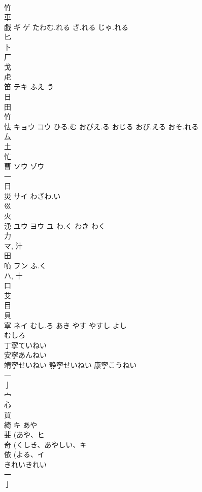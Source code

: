 \documentclass[8pt]{extreport}
\begin{document}
\begin{CJK}{UTF8}{min}
\\	竹 
\\	車 
\\	戯	ギ ゲ	たわむ.れる ざ.れる じゃ.れる	
\\	匕 
\\	卜 
\\	厂 
\\	戈 
\\	虍 
\\	笛	テキ	ふえ う	
\\	日 
\\	田 
\\	竹 
\\	怯	キョウ コウ	ひる.む おびえ.る おじる おび.える おそ.れる	
\\	厶 
\\	土 
\\	忙 
\\	曹	ソウ ゾウ		
\\	一 
\\	日 
\\	災	サイ	わざわ.い	
\\	巛 
\\	火 
\\	湧	ユウ ヨウ ユ	わ.く わき わく	
\\	力 
\\	マ, 汁 
\\	田 
\\	噴	フン	ふ.く	
\\	ハ, 十 
\\	口 
\\	艾 
\\	目 
\\	貝 
\\	寧	ネイ	むし.ろ あき やす やすし よし	
\\	むしろ 
\\	丁寧ていねい 
\\	安寧あんねい 
\\	靖寧せいねい 静寧せいねい 康寧こうねい 
\\	一 
\\	亅 
\\	宀 
\\	心 
\\	買 
\\	綺	キ	あや	
\\	斐 (あや、ヒ 
\\	奇 (くしき、あやしい、キ 
\\	依 (よる、イ 
\\	きれいきれい
\\	一 
\\	亅 

\end{CJK}
\end{document}
